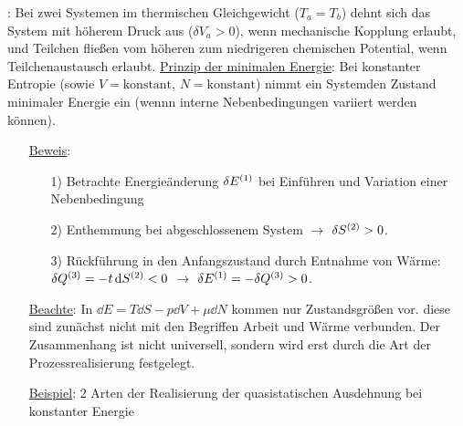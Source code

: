 : Bei zwei Systemen im thermischen Gleichgewicht ($T_a = T_b$) dehnt sich das System mit höherem Druck aus ($\delta V_a >0$), wenn mechanische Kopplung erlaubt, und Teilchen fließen vom höheren zum niedrigeren chemischen Potential, wenn Teilchenaustausch erlaubt.
\uline{Prinzip der minimalen Energie}: Bei konstanter Entropie (sowie $V=\text{konstant}$, $N=\text{konstant}$) nimmt ein Systemden Zustand minimaler Energie ein (wennn interne Nebenbedingungen variiert werden können).

\begin{itemize}[align=left]
  \item[\uline{Beweis}:] \begin{itemize}[align=left]
    \item[1)] Betrachte Energieänderung $\delta E^{\left( 1 \right)}$ bei Einführen und Variation einer Nebenbedingung\\ 
    \item[2)] Enthemmung bei abgeschlossenem System $\rightarrow$ $\delta S^{\left( 2 \right)}>0$.
    \item[3)] Rückführung in den Anfangszustand durch Entnahme von Wärme: $\delta Q^{\left( 3 \right)}=-t\,\text d{S}^{\left( 2 \right)} < 0$ $\rightarrow$ $\delta E^{\left( 1 \right)} = -\delta Q^{\left( 3 \right)} > 0$.
\end{itemize}
  \item[\uline{Beachte}:] In $\dd{E} = T \dd{S} - p \dd{V} + \mu \dd{N}$ kommen nur Zustandsgrößen vor. diese sind zunächst nicht mit den Begriffen Arbeit und Wärme verbunden. Der Zusammenhang ist nicht universell, sondern wird erst durch die Art der Prozessrealisierung festgelegt.
  \item[\uline{Beispiel}:] $2$ Arten der Realisierung der quasistatischen Ausdehnung bei konstanter Energie
\end{itemize}

\renewcommand{\arraystretch}{1}

